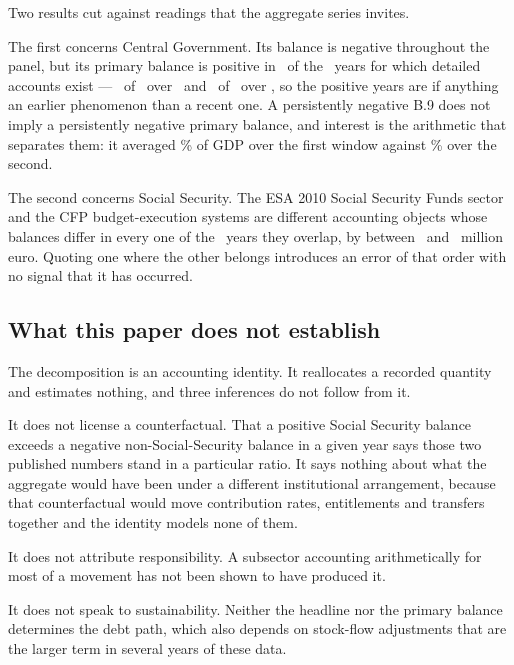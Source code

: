 Two results cut against readings that the aggregate series invites.

The first concerns Central Government. Its balance is negative throughout the panel,
but its primary balance is positive in \PrimaryPositiveYears\ of the
\PrimaryObservedYears\ years for which detailed accounts exist ---
\HistoricalPrimaryPositive\ of \HistoricalPrimaryYears\ over \HistoricalPrimaryWindow\
and \ModernPrimaryPositive\ of \ModernPrimaryYears\ over \ModernPrimaryWindow, so the
positive years are if anything an earlier phenomenon than a recent one. A persistently
negative B.9 does not imply a persistently negative primary balance, and interest is the
arithmetic that separates them: it averaged \HistoricalInterestMean\% of GDP over the
first window against \ModernInterestMean\% over the second.

The second concerns Social Security. The ESA 2010 Social Security Funds sector and
the CFP budget-execution systems are different accounting objects whose balances
differ in every one of the \SsfBoundaryYears\ years they overlap, by between
\SsfBoundaryMin\ and \SsfBoundaryMax\ million euro. Quoting one where the other
belongs introduces an error of that order with no signal that it has occurred.

\subsection{What this paper does not establish}

The decomposition is an accounting identity. It reallocates a recorded quantity and
estimates nothing, and three inferences do not follow from it.

It does not license a counterfactual. That a positive Social Security balance exceeds
a negative non-Social-Security balance in a given year says those two published
numbers stand in a particular ratio. It says nothing about what the aggregate would
have been under a different institutional arrangement, because that counterfactual
would move contribution rates, entitlements and transfers together and the identity
models none of them.

It does not attribute responsibility. A subsector accounting arithmetically for most
of a movement has not been shown to have produced it.

It does not speak to sustainability. Neither the headline nor the primary balance
determines the debt path, which also depends on stock-flow adjustments that are the
larger term in several years of these data.

